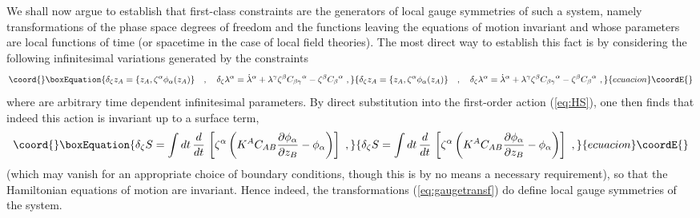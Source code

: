 \documentclass[a4paper,11pt]{article}
\begin{document}
We shall now argue to establish that first-class constraints are the
ge\-ne\-ra\-tors of local gauge symmetries of such a system, namely 
transformations
of the phase space degrees of freedom \coordHE{} and the functions \myHighlight{$\lambda^\alpha$}\coordHE{}
leaving the equations of motion invariant and whose parameters are local
functions of time (or spacetime in the case of local field theories).
The most direct way to establish this fact is by considering the following
infinitesimal variations generated by the constraints
\begin{equation}\coord{}\boxEquation{
\delta_\zeta z_A=\{z_A,\zeta^\alpha\phi_\alpha(z_A)\}\ \ \ ,\ \ \ 
\delta_\zeta\lambda^\alpha=\dot{\lambda}^\alpha+
\lambda^\gamma\zeta^\beta{C_{\beta\gamma}}^\alpha-
\zeta^\beta{C_\beta}^\alpha\ ,
\label{eq:gaugetransf}
}{
\delta_\zeta z_A=\{z_A,\zeta^\alpha\phi_\alpha(z_A)\}\ \ \ ,\ \ \ 
\delta_\zeta\lambda^\alpha=\dot{\lambda}^\alpha+
\lambda^\gamma\zeta^\beta{C_{\beta\gamma}}^\alpha-
\zeta^\beta{C_\beta}^\alpha\ ,
}{ecuacion}\coordE{}\end{equation}
where \coordHE{} are arbitrary time dependent infinitesimal parameters.
By direct substitution into the first-order action (\ref{eq:HS}), one then
finds that indeed this action is invariant up to a surface term,
\begin{equation}\coord{}\boxEquation{
\delta_\zeta S=\int dt\,\frac{d}{dt}\,\left[
\zeta^\alpha\left(K^AC_{AB}\frac{\partial\phi_\alpha}{\partial z_B}-
\phi_\alpha\right)\right]\ ,
}{
\delta_\zeta S=\int dt\,\frac{d}{dt}\,\left[
\zeta^\alpha\left(K^AC_{AB}\frac{\partial\phi_\alpha}{\partial z_B}-
\phi_\alpha\right)\right]\ ,
}{ecuacion}\coordE{}\end{equation}
(which may vanish for an appropriate choice of boundary conditions, though
this is by no means a necessary requirement), so that the Hamiltonian
equations of motion are invariant. Hence indeed, the transformations
(\ref{eq:gaugetransf}) do define local gauge symmetries of the system.
\end{document}
